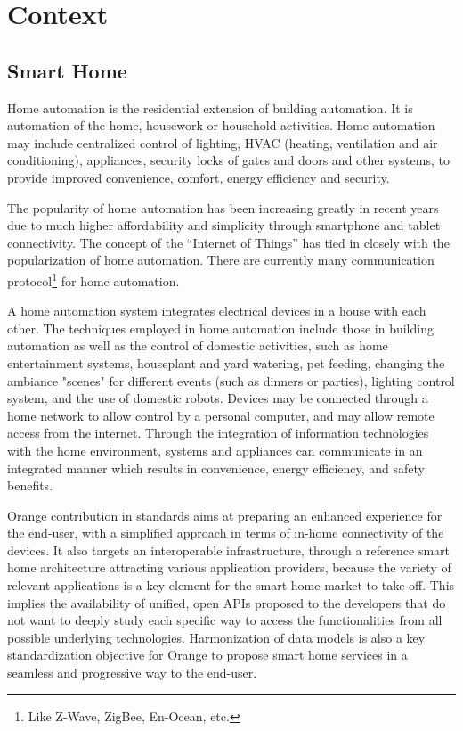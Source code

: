 
\section{Context}
\subsection{Smart Home}

Home automation \cite{homeautomation} is the residential extension of building automation. It is automation of the home, housework or household activities. Home automation may include centralized control of lighting, HVAC (heating, ventilation and air conditioning), appliances, security locks of gates and doors and other systems, to provide improved convenience, comfort, energy efficiency and security.

The popularity of home automation has been increasing greatly in recent years due to much higher affordability and simplicity through smartphone and tablet connectivity. The concept of the ``Internet of Things'' has tied in closely with the popularization of home automation. There are currently many communication protocol\footnote{Like Z-Wave, ZigBee, En-Ocean, etc.} for home automation.

A home automation system \cite{homeautomation1} integrates electrical devices in a house with each other. The techniques employed in home automation include those in building automation as well as the control of domestic activities, such as home entertainment systems, houseplant and yard watering, pet feeding, changing the ambiance "scenes" for different events (such as dinners or parties), lighting control system, and the use of domestic robots. Devices may be connected through a home network to allow control by a personal computer, and may allow remote access from the internet. Through the integration of information technologies with the home environment, systems and appliances can communicate in an integrated manner which results in convenience, energy efficiency, and safety benefits.

Orange contribution in standards aims at preparing an enhanced experience for the end-user, with a simplified approach in terms of in-home connectivity of the devices. It also targets an interoperable infrastructure, through a reference smart home architecture attracting various application providers, because the variety of relevant applications is a key element for the smart home market to take-off. This implies the availability of unified, open APIs proposed to the developers that do not want to deeply study each specific way to access the functionalities from all possible underlying technologies. Harmonization of data models is also a key standardization objective for Orange to propose smart home services in a seamless and progressive way to the end-user.
